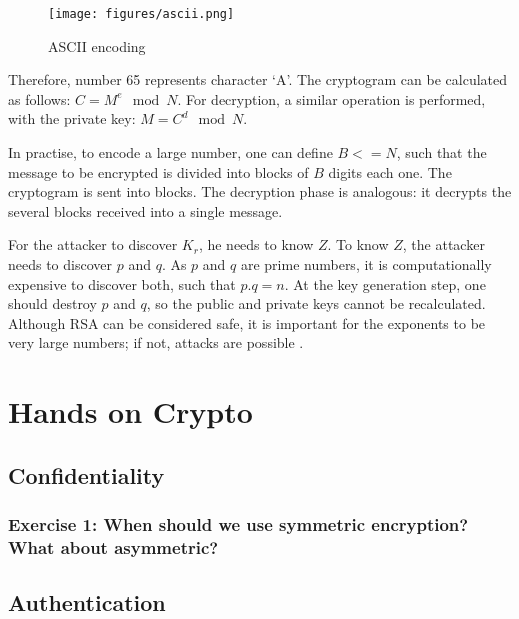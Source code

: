 \documentclass[12pt,a4paper]{article}
\theoremstyle{definition}
\begin{document}
{\begin{figure}[h]
    \centering
    \texttt{[image: figures/ascii.png]}
    \caption{ASCII encoding}
    \label{fig:ascii}
\end{figure}

Therefore, number 65 represents character `A'. The cryptogram can be calculated as follows: $C = M^e \mod N$. For decryption, a similar operation is performed, with the private key: $M = C^d \mod N$.

In practise, to encode a large number, one can define $B <= N$, such that the message to be encrypted is divided into blocks of $B$ digits each one. The cryptogram is sent into blocks. The decryption phase is analogous: it decrypts the several blocks received into a single message. 

For the attacker to discover $K_r$, he needs to know $Z$. To know $Z$, the attacker needs to discover $p$ and $q$. As $p$ and $q$ are prime numbers, it is computationally expensive to discover both, such that $p.q = n$. At the key generation step, one should destroy $p$ and $q$, so the public and private keys cannot be recalculated. Although RSA can be considered safe, it is important for the exponents to be very large numbers; if not, attacks are possible \cite{wiener90}.
}


\section{Hands on Crypto}

\subsection*{Confidentiality}
\subsubsection*{Exercise 1: When should we use symmetric encryption? What about asymmetric?}

\subsection*{Authentication}
\end{document}
